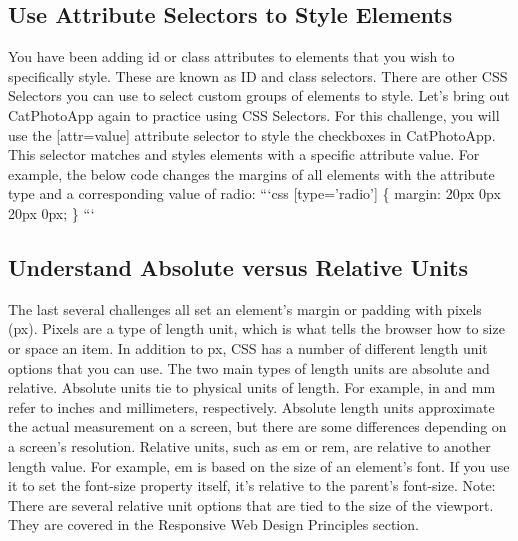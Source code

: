 \documentclass{article}%
\begin{document}
%
\subsection{Use Attribute Selectors to Style Elements}%
\label{subsec:UseAttributeSelectorstoStyleElements}%
You have been adding id or class attributes to elements that you wish to specifically style. These are known as ID and class selectors. There are other CSS Selectors you can use to select custom groups of elements to style.\newline%
Let's bring out CatPhotoApp again to practice using CSS Selectors.\newline%
For this challenge, you will use the {[}attr=value{]} attribute selector to style the checkboxes in CatPhotoApp. This selector matches and styles elements with a specific attribute value. For example, the below code changes the margins of all elements with the attribute type and a corresponding value of radio:\newline%
```css\newline%
{[}type='radio'{]} \{\newline%
  margin: 20px 0px 20px 0px;\newline%
\}\newline%
```\newline%

%
\subsection{Understand Absolute versus Relative Units}%
\label{subsec:UnderstandAbsoluteversusRelativeUnits}%
The last several challenges all set an element's margin or padding with pixels (px). Pixels are a type of length unit, which is what tells the browser how to size or space an item. In addition to px, CSS has a number of different length unit options that you can use.\newline%
The two main types of length units are absolute and relative. Absolute units tie to physical units of length. For example, in and mm refer to inches and millimeters, respectively. Absolute length units approximate the actual measurement on a screen, but there are some differences depending on a screen's resolution.\newline%
Relative units, such as em or rem, are relative to another length value. For example, em is based on the size of an element's font. If you use it to set the font{-}size property itself, it's relative to the parent's font{-}size.\newline%
Note: There are several relative unit options that are tied to the size of the viewport. They are covered in the Responsive Web Design Principles section.\newline%
\end{document}
